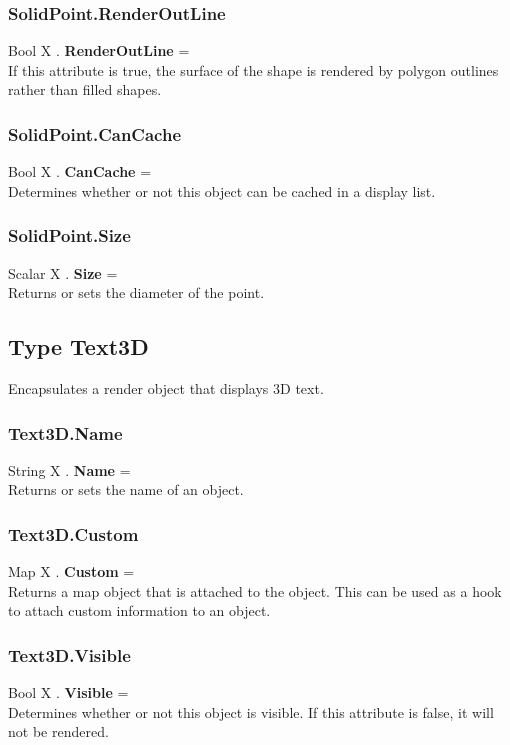 \documentclass[10pt]{book}
\begin{document}
\subsubsection{SolidPoint.RenderOutLine \label{F:SolidPoint:RenderOutLine}}
Bool X . \textbf{RenderOutLine} = \\
If this attribute is true, the surface of the shape is rendered by polygon outlines rather than filled shapes.

\subsubsection{SolidPoint.CanCache \label{F:SolidPoint:CanCache}}
Bool X . \textbf{CanCache} = \\
Determines whether or not this object can be cached in a display list.

\subsubsection{SolidPoint.Size \label{F:SolidPoint:Size}}
Scalar X . \textbf{Size} = \\
Returns or sets the diameter of the point.

\subsection{Type Text3D \label{T:Text3D}}
Encapsulates a render object that displays 3D text.

\subsubsection{Text3D.Name \label{F:Text3D:Name}}
String X . \textbf{Name} = \\
Returns or sets the name of an object.

\subsubsection{Text3D.Custom \label{F:Text3D:Custom}}
Map X . \textbf{Custom} = \\
Returns a map object that is attached to the object. This can be used as a hook to attach custom information to an object.


\subsubsection{Text3D.Visible \label{F:Text3D:Visible}}
Bool X . \textbf{Visible} = \\
Determines whether or not this object is visible. If this attribute is false, it will not be rendered.
\end{document}
